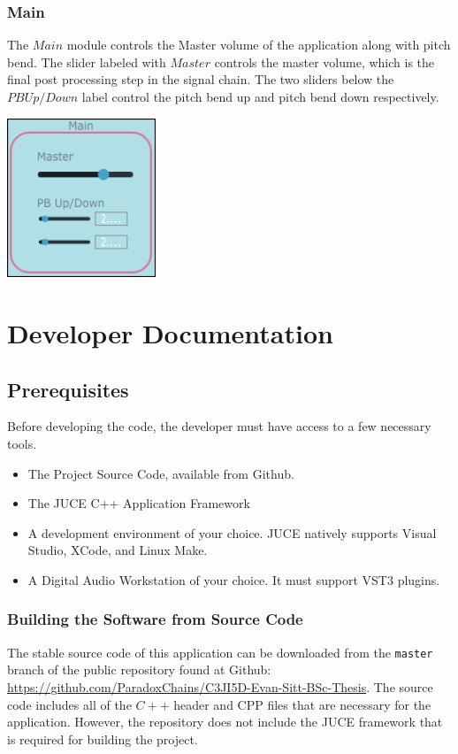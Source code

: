 \documentclass[a4paper,12pt]{report}
\begin{document}
\subsection{Main}
\label{subsec:main}
The $Main$ module controls the Master volume of the application along with pitch bend. The slider labeled with $Master$ controls the master volume, which is the final post processing step in the signal chain. The two sliders below the $PB Up/Down$ label control the pitch bend up and pitch bend down respectively.

\begin{center}
\includegraphics[width=12em]{MainControlScreenshot.png}
\end{center}


\chapter{Developer Documentation}
\label{chapter:devdocs}

\section{Prerequisites}
\label{sec:prereq}
Before developing the code, the developer must have access to a few necessary tools.
\begin{itemize}
\item The Project Source Code, available from Github.
\item The JUCE C++ Application Framework
\item A development environment of your choice. JUCE natively supports Visual Studio, XCode, and Linux Make.
\item A Digital Audio Workstation of your choice. It must support VST3 plugins.
\end{itemize}
\subsection{Building the Software from Source Code}
\label{subsec:buildingasoftware}
The stable source code of this application can be downloaded from the \texttt{master} branch of the public repository found at Github: \href{https://github.com/ParadoxChains/C3JI5D-Evan-Sitt-BSc-Thesis}{https://github.com/ParadoxChains/C3JI5D-Evan-Sitt-BSc-Thesis}. The source code includes all of the $C++$ header and CPP files that are necessary for the application. However, the repository does not include the JUCE framework that is required for building the project.
\end{document}
